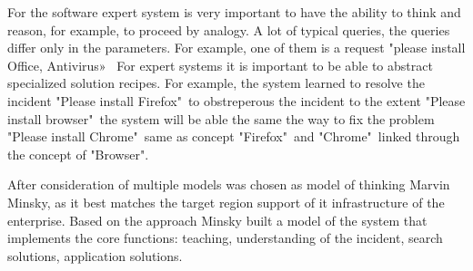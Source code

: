 For the software expert system is very important to have the ability to think and reason, for example, to proceed by analogy. A lot of typical queries, the queries differ only in the parameters. For example, one of them is a request "please install Office, Antivirus» \etc\ For expert systems it is important to be able to abstract specialized solution recipes. For example, the system learned to resolve the incident "Please install Firefox"\comma\ to obstreperous the incident to the extent "Please install browser"\comma\ the system will be able the same the way to fix the problem "Please install Chrome"\comma\ same as concept "Firefox"\ and "Chrome"\ linked through the concept of "Browser". \par
After consideration of multiple models was chosen as model of thinking Marvin Minsky, as it best matches the target region support of it infrastructure of the enterprise. Based on the approach Minsky built a model of the system that implements the core functions: teaching, understanding of the incident, search solutions, application solutions. 


